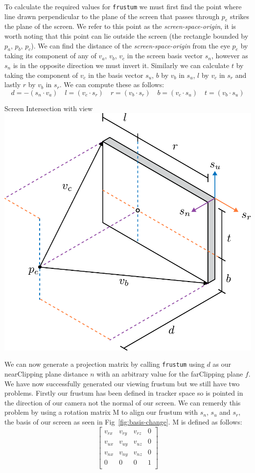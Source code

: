 To calculate the required values for \texttt{frustum} we must first find the point where line drawn perpendicular to the plane of the screen that passes through $p_e$ strikes the plane of the screen. We refer to this point as the {\it screen-space-origin}, it is worth noting that this point can lie outside the screen (the rectangle bounded by $p_a$, $p_b$, $p_c$). We can find the distance of the {\it screen-space-origin} from the eye $p_e$ by taking its component of any of $v_a$, $v_b$, $v_c$ in the screen basis vector $s_n$, however as $s_n$ is in the opposite direction we must invert it. Similarly we can calculate $t$ by taking the component of $v_c$ in the basis vector $s_u$, $b$ by $v_b$ in $s_u$, $l$ by $v_c$ in $s_r$ and lastly $r$ by $v_b$ in $s_r$. We can compute these as follows:
\[ d= -(s_n \cdot v_a) \quad l = (v_c \cdot s_r) \quad r = (v_b \cdot s_r) \quad b = (v_c \cdot s_u) \quad t = (v_b \cdot s_u) \]

\begin{figureBox}[label={fig:screen-extents}]{Screen Intersection with view}
    \includegraphics[width = 0.5\linewidth]{./background/figures/projection/eye-projection.pdf}
\end{figureBox}

We can now generate a projection matrix by calling \texttt{frustum} using $d$ as our nearClipping plane distance $n$ with an arbitrary value for the farClipping plane $f$. We have now successfully generated our viewing frustum but we still have two problems. Firstly our frustum has been defined in tracker space so is pointed in the direction of our camera not the normal of our screen. We can remerdy this problem by using a rotation matrix M to align our frustum with $s_n$, $s_u$ and $s_r$, the basis of our screen as seen in Fig~\ref{fig:basis-change}. M is defined as follows:
\[
    \begin{bmatrix}
        v_{rx} & v_{ry} & v_{rz} & 0 \\
        v_{ux} & v_{uy} & v_{uz} & 0 \\
        v_{nx} & v_{ny} & v_{nz} & 0 \\
        0      & 0      & 0      & 1 \\
    \end{bmatrix}
\]

